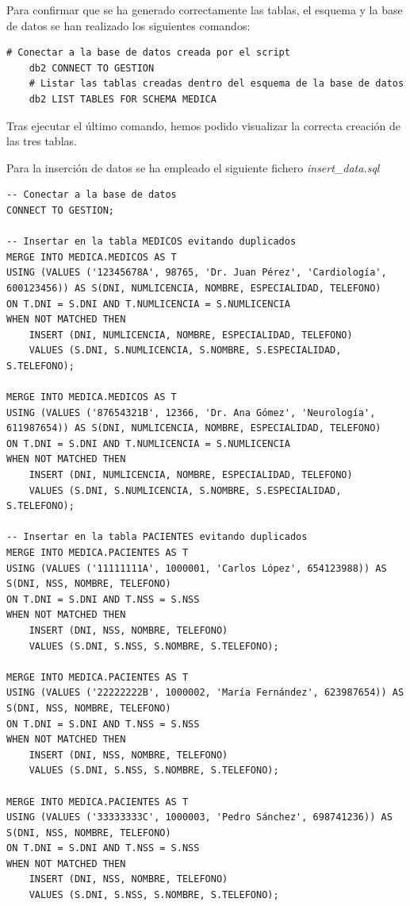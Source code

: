 \documentclass{article}
\begin{document}
\newline
Para confirmar que se ha generado correctamente las tablas, el esquema y la base de datos se han realizado los siguientes comandos:
\begin{lstlisting}[style=bashStyle]
    # Conectar a la base de datos creada por el script
    db2 CONNECT TO GESTION
    # Listar las tablas creadas dentro del esquema de la base de datos
    db2 LIST TABLES FOR SCHEMA MEDICA
\end{lstlisting}
Tras ejecutar el último comando, hemos podido visualizar la correcta creación de las tres tablas.

Para la inserción de datos se ha empleado el siguiente fichero \textit{insert\_data.sql}
\begin{verbatim}
-- Conectar a la base de datos
CONNECT TO GESTION;

-- Insertar en la tabla MEDICOS evitando duplicados
MERGE INTO MEDICA.MEDICOS AS T
USING (VALUES ('12345678A', 98765, 'Dr. Juan Pérez', 'Cardiología', 600123456)) AS S(DNI, NUMLICENCIA, NOMBRE, ESPECIALIDAD, TELEFONO)
ON T.DNI = S.DNI AND T.NUMLICENCIA = S.NUMLICENCIA
WHEN NOT MATCHED THEN
    INSERT (DNI, NUMLICENCIA, NOMBRE, ESPECIALIDAD, TELEFONO)
    VALUES (S.DNI, S.NUMLICENCIA, S.NOMBRE, S.ESPECIALIDAD, S.TELEFONO);

MERGE INTO MEDICA.MEDICOS AS T
USING (VALUES ('87654321B', 12366, 'Dr. Ana Gómez', 'Neurología', 611987654)) AS S(DNI, NUMLICENCIA, NOMBRE, ESPECIALIDAD, TELEFONO)
ON T.DNI = S.DNI AND T.NUMLICENCIA = S.NUMLICENCIA
WHEN NOT MATCHED THEN
    INSERT (DNI, NUMLICENCIA, NOMBRE, ESPECIALIDAD, TELEFONO)
    VALUES (S.DNI, S.NUMLICENCIA, S.NOMBRE, S.ESPECIALIDAD, S.TELEFONO);

-- Insertar en la tabla PACIENTES evitando duplicados
MERGE INTO MEDICA.PACIENTES AS T
USING (VALUES ('11111111A', 1000001, 'Carlos López', 654123988)) AS S(DNI, NSS, NOMBRE, TELEFONO)
ON T.DNI = S.DNI AND T.NSS = S.NSS
WHEN NOT MATCHED THEN
    INSERT (DNI, NSS, NOMBRE, TELEFONO)
    VALUES (S.DNI, S.NSS, S.NOMBRE, S.TELEFONO);

MERGE INTO MEDICA.PACIENTES AS T
USING (VALUES ('22222222B', 1000002, 'María Fernández', 623987654)) AS S(DNI, NSS, NOMBRE, TELEFONO)
ON T.DNI = S.DNI AND T.NSS = S.NSS
WHEN NOT MATCHED THEN
    INSERT (DNI, NSS, NOMBRE, TELEFONO)
    VALUES (S.DNI, S.NSS, S.NOMBRE, S.TELEFONO);

MERGE INTO MEDICA.PACIENTES AS T
USING (VALUES ('33333333C', 1000003, 'Pedro Sánchez', 698741236)) AS S(DNI, NSS, NOMBRE, TELEFONO)
ON T.DNI = S.DNI AND T.NSS = S.NSS
WHEN NOT MATCHED THEN
    INSERT (DNI, NSS, NOMBRE, TELEFONO)
    VALUES (S.DNI, S.NSS, S.NOMBRE, S.TELEFONO);


\end{verbatim}
\end{document}
